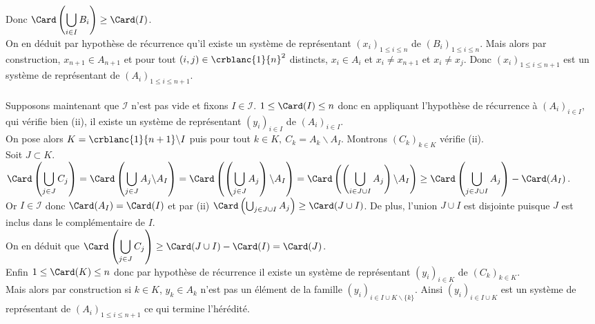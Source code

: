 \documentclass[8pt]{book}
\begin{document}
	Donc $\displaystyle\Card\left(\bigcup_{i\in I}B_i\right)\geq \Card(I)$.\\
	On en déduit par hypothèse de récurrence qu'il existe un système de représentant $(x_i)_{1\leq i\leq n}$ de $(B_i)_{1\leq i\leq n}$. Mais alors par construction, $x_{n+1}\in A_{n+1}$ et pour tout $(i,j)\in \crblanc{1}{n}^2$ distincts, $x_i\in A_i$ et $x_i\ne x_{n+1}$ et $x_i\ne x_j$. Donc $(x_i)_{1\leq i\leq n+1}$ est un système de représentant de $(A_i)_{1\leq i\leq n+1}$.\\\\
	Supposons maintenant que $\mathcal I$ n'est pas vide et fixons $I\in \mathcal I$. $1\leq\Card(I)\leq n$ donc en appliquant l'hypothèse de récurrence à $(A_i)_{i\in I}$, qui vérifie bien (ii), il existe un système de représentant $(y_i)_{i\in I}$ de $(A_i)_{i\in I}$.\\
	On pose alors $K=\crblanc{1}{n+1}\backslash I$ puis pour tout $k\in K,\ C_k=A_k\backslash A_I$. Montrons $(C_k)_{k\in K}$ vérifie (ii).\\
	Soit $J\subset K$.\\
	$\displaystyle\Card\left(\bigcup_{j\in J}C_j\right)=\Card\left(\bigcup_{j\in J}A_j\backslash A_I\right)=\Card\left(\left(\bigcup_{j\in J}A_j\right)\backslash A_I\right)=\Card\left(\left(\bigcup_{i\in J\cup I}A_j\right)\backslash A_I\right)\geq \Card\left(\bigcup_{j\in J\cup I}A_j\right)-\Card(A_I)$.\\
	Or $I\in \mathcal I$ donc $\Card(A_I)=\Card(I)$ et par (ii) $\Card\left(\bigcup_{j\in J\cup I}A_j\right)\geq \Card(J\cup I)$. De plus, l'union $J\cup I$ est disjointe puisque $J$ est inclus dans le complémentaire de $I$.\\
	On en déduit que $\displaystyle\Card\left(\bigcup_{j\in J}C_j\right)\geq \Card(J\cup I)-\Card(I)=\Card(J)$.\\
	Enfin $1\leq\Card(K)\leq n$ donc par hypothèse de récurrence il existe un système de représentant $(y_i)_{i\in K}$ de $(C_k)_{k\in K}$.\\
	Mais alors par construction si $k\in K$, $y_k\in A_k$ n'est pas un élément de la famille $(y_i)_{i\in I\cup K\backslash\{k\}}$. Ainsi $(y_i)_{i\in I\cup K}$ est un système de représentant de $(A_i)_{1\leq i\leq n+1}$ ce qui termine l'hérédité.
	
\end{document}
